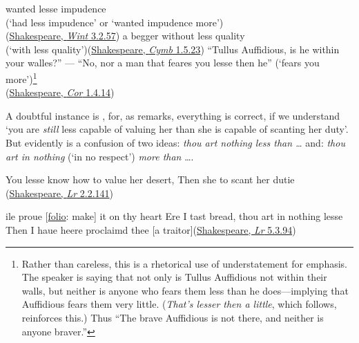 \ea \label{ex:07-96}
\ea{}
wanted lesse impudence\\(`had less impudence' or `wanted impudence more') \\\hfill(\href{https://internetshakespeare.uvic.ca/doc/WT_F1/scene/3.2/index.html#tln-1230}{Shakespeare, \textit{Wint} 3.2.57})
\ex
a begger without less quality\\(`with less quality')\hfill(\href{https://internetshakespeare.uvic.ca/doc/Cym_F1/scene/1.5/index.html#tln-335}{Shakespeare, \textit{Cymb} 1.5.23}) %
\ex
``Tullus Auffidious, is he within your walles?'' --- ``No, nor a man that feares you lesse then he'' \phantom{x} (`fears you more')\footnote{Rather than careless, this is a rhetorical use of understatement for emphasis. The speaker is saying that not only is Tullus Auffidious not within their walls, but neither is anyone who fears them less than he does---implying that Auffidious fears them very little. (\textit{That's lesser then a little}, which follows, reinforces this.) Thus ``The brave Auffidious is not there, and neither is anyone braver.'' \eds}\\\hfill(\href{https://internetshakespeare.uvic.ca/doc/Cor_F1/scene/1.4/index.html#tln-500}{Shakespeare, \textit{Cor} 1.4.14}) %
\z
\z

\noindent A doubtful instance is , for, as \citet[70]{koppel1899} remarks, %
everything is correct, if we understand `you are \emph{still} less capable of valuing her than she is capable of scanting her duty'. But  evidently is a confusion of two ideas: \textit{thou art nothing less than {\dots}} and: \textit{thou art in nothing} (`in no respect') \textit{more than} {\dots}. 

\ea \label{ex:07-99}
You lesse know how to value her desert, Then she to scant her dutie\\\hfill(\href{https://internetshakespeare.uvic.ca/doc/Lr_F1/scene/2.2/index.html#tln-1415}{Shakespeare, \textit{Lr} 2.2.141}) %
\z

\ea \label{ex:07-100}
ile proue [\href{https://internetshakespeare.uvic.ca/doc/Lr_F1/page/25/#tln-3040}{folio}: make] it on thy heart Ere I tast bread, thou art in nothing lesse Then I haue heere proclaimd thee [a traitor]\hfill(\href{https://internetshakespeare.uvic.ca/doc/Lr_Q1/complete/index.html#tln-3040}{Shakespeare, \textit{Lr} 5.3.94}) %
\z

